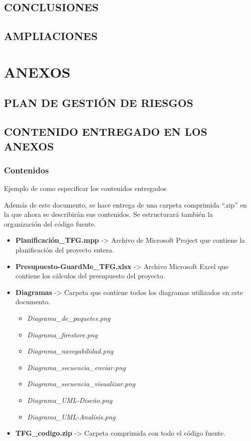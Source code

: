 \documentclass[11pt]{report}
\begin{document}
\section{CONCLUSIONES}

\newpage
\section{AMPLIACIONES} 


\newpage
\chapter*{ANEXOS}
\newpage
{}
\section*{PLAN DE GESTIÓN DE RIESGOS}

\newpage
\section*{CONTENIDO ENTREGADO EN LOS ANEXOS} 

\subsection*{Contenidos} 

\textcolor[rgb]{0.65,0.16,0}{Ejemplo de como especificar los contenidos entregados}

Además de este documento, se hace entrega de una carpeta comprimida ``.zip'' en la que ahora se describirán sus contenidos. Se estructurará también la organización del código fuente.

\begin{itemize}
	\item \textbf{Planificación\_TFG.mpp} -> Archivo de Microsoft Project que contiene la planificación del proyecto entera.
	\item \textbf{Presupuesto-GuardMe\_TFG.xlsx} -> Archivo Microsoft Excel que contiene los cálculos del presupuesto del proyecto.
	\item \textbf{Diagramas} -> Carpeta que contiene todos los diagramas utilizados en este documento.
	\begin{itemize}
		\item \textit{Diagrama\_de\_paquetes.png}
		\item \textit{Diagrama\_firestore.png}
		\item \textit{Diagrama\_navegabilidad.png}
		\item \textit{Diagrama\_secuencia\_enviar.png}
		\item \textit{Diagrama\_secuencia\_visualizar.png}
		\item \textit{Diagrama\_UML-Diseño.png}
		\item \textit{Diagrama\_UML-Analisis.png}
	\end{itemize}
	\item \textbf{TFG\_codigo.zip} -> Carpeta comprimida con todo el código fuente.
\end{itemize}
\end{document}
